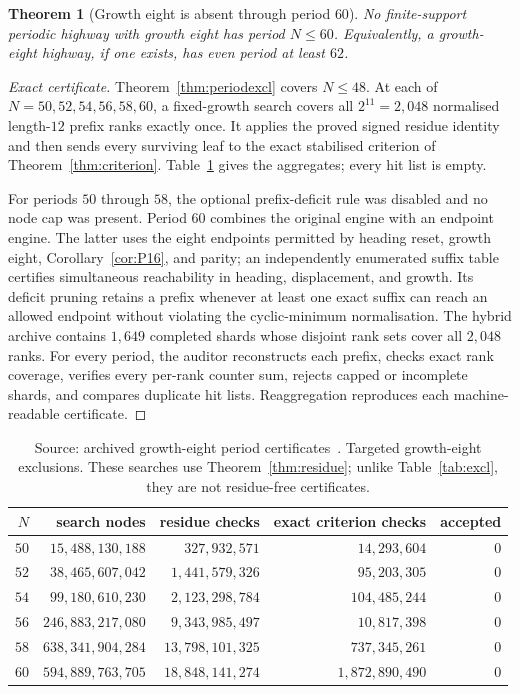 \documentclass[11pt,letterpaper]{article}
\theoremstyle{plain}
\newtheorem{theorem}{Theorem}[section]
\theoremstyle{definition}
\begin{document}
\begin{NoHyper}
\begin{theorem}[Growth eight is absent through period $60$]\label{thm:g8period60}
No finite-support periodic highway with growth eight has period
$N\le60$.  Equivalently, a growth-eight highway, if one exists, has even period
at least $62$.
\end{theorem}

\begin{proof}[Exact certificate]
Theorem~\ref{thm:periodexcl} covers $N\le48$.  At each of
$N=50,52,54,56,58,60$, a fixed-growth search covers all $2^{11}=2{,}048$
normalised length-$12$ prefix ranks exactly once.  It applies the proved signed
residue identity and then sends every surviving leaf to the exact stabilised
criterion of Theorem~\ref{thm:criterion}.  Table~\ref{tab:g8periods} gives the
aggregates; every hit list is empty.

For periods $50$ through $58$, the optional prefix-deficit rule was disabled
and no node cap was present.  Period $60$ combines the original engine with an
endpoint engine.  The latter uses the eight endpoints permitted by heading
reset, growth eight, Corollary~\ref{cor:P16}, and parity; an independently
enumerated suffix table certifies simultaneous reachability in heading,
displacement, and growth.  Its deficit pruning retains a prefix whenever at
least one exact suffix can reach an allowed endpoint without violating the
cyclic-minimum normalisation.  The hybrid archive contains $1{,}649$ completed
shards whose disjoint rank sets cover all $2{,}048$ ranks.  For every period,
the auditor reconstructs each prefix, checks exact rank coverage, verifies every
per-rank counter sum, rejects capped or incomplete shards, and compares duplicate
hit lists.  Reaggregation reproduces each machine-readable certificate.
\end{proof}

\begin{table}[t]
\centering
\normalsize
\begin{tabular}{@{}rrrrr@{}}
\toprule
$N$ & search nodes & residue checks & exact criterion checks & accepted\\
\midrule
$50$ & $15{,}488{,}130{,}188$ & $327{,}932{,}571$ & $14{,}293{,}604$ & $0$\\
$52$ & $38{,}465{,}607{,}042$ & $1{,}441{,}579{,}326$ & $95{,}203{,}305$ & $0$\\
$54$ & $99{,}180{,}610{,}230$ & $2{,}123{,}298{,}784$ & $104{,}485{,}244$ & $0$\\
$56$ & $246{,}883{,}217{,}080$ & $9{,}343{,}985{,}497$ & $10{,}817{,}398$ & $0$\\
$58$ & $638{,}341{,}904{,}284$ & $13{,}798{,}101{,}325$ &
$737{,}345{,}261$ & $0$\\
$60$ & $594{,}889{,}763{,}705$ & $18{,}848{,}141{,}274$ &
$1{,}872{,}890{,}490$ & $0$\\
\bottomrule
\end{tabular}
\caption{Source: archived growth-eight period certificates~\cite{Repo}.
Targeted growth-eight exclusions. These searches
use Theorem~\ref{thm:residue}; unlike Table~\ref{tab:excl}, they are not
residue-free certificates.}
\label{tab:g8periods}
\end{table}


\end{NoHyper}
\end{document}
